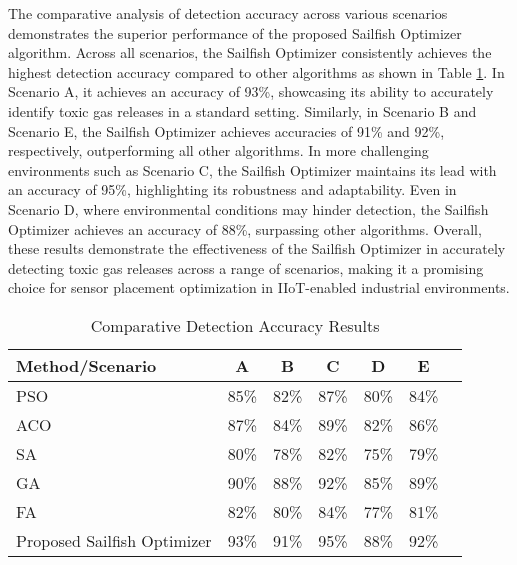 \documentclass[conference]{IEEEtran}
\begin{document}
The comparative analysis of detection accuracy across various scenarios demonstrates the superior performance of the proposed Sailfish Optimizer algorithm. Across all scenarios, the Sailfish Optimizer consistently achieves the highest detection accuracy compared to other algorithms as shown in Table \ref{tab:detection_accuracy_comparison}. In Scenario A, it achieves an accuracy of 93\%, showcasing its ability to accurately identify toxic gas releases in a standard setting. Similarly, in Scenario B and Scenario E, the Sailfish Optimizer achieves accuracies of 91\% and 92\%, respectively, outperforming all other algorithms. In more challenging environments such as Scenario C, the Sailfish Optimizer maintains its lead with an accuracy of 95\%, highlighting its robustness and adaptability. Even in Scenario D, where environmental conditions may hinder detection, the Sailfish Optimizer achieves an accuracy of 88\%, surpassing other algorithms. Overall, these results demonstrate the effectiveness of the Sailfish Optimizer in accurately detecting toxic gas releases across a range of scenarios, making it a promising choice for sensor placement optimization in IIoT-enabled industrial environments.
\begin{table}[htbp]
\centering
\caption{Comparative Detection Accuracy Results}
\label{tab:detection_accuracy_comparison}
\begin{tabular}{lcccccc}
\toprule
\textbf{Method/Scenario} & \textbf{A} & \textbf{B} & \textbf{C} & \textbf{D} & \textbf{E} \\
\midrule
PSO & 85\% & 82\% & 87\% & 80\% & 84\% \\
ACO & 87\% & 84\% & 89\% & 82\% & 86\% \\
SA & 80\% & 78\% & 82\% & 75\% & 79\% \\
GA & 90\% & 88\% & 92\% & 85\% & 89\% \\
FA& 82\% & 80\% & 84\% & 77\% & 81\% \\
Proposed Sailfish Optimizer& 93\% & 91\% & 95\% & 88\% & 92\% \\
\bottomrule
\end{tabular}
\end{table}
\end{document}
